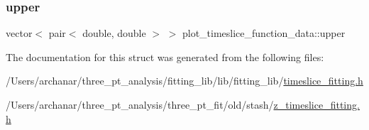 \mbox{\label{structplot__timeslice__function__data_abc2e47244a22d040be23aa17474d489e}} 
\subsubsection{\texorpdfstring{upper}{upper}}
{\footnotesize\ttfamily vector$<$ pair$<$ double, double $>$ $>$ plot\+\_\+timeslice\+\_\+function\+\_\+data\+::upper}



The documentation for this struct was generated from the following files\+:\begin{DoxyCompactItemize}
\item 
/\+Users/archanar/three\+\_\+pt\+\_\+analysis/fitting\+\_\+lib/lib/fitting\+\_\+lib/\mbox{\hyperlink{lib_2fitting__lib_2timeslice__fitting_8h}{timeslice\+\_\+fitting.\+h}}\item 
/\+Users/archanar/three\+\_\+pt\+\_\+analysis/three\+\_\+pt\+\_\+fit/old/stash/\mbox{\hyperlink{old_2stash_2z__timeslice__fitting_8h}{z\+\_\+timeslice\+\_\+fitting.\+h}}\end{DoxyCompactItemize}
